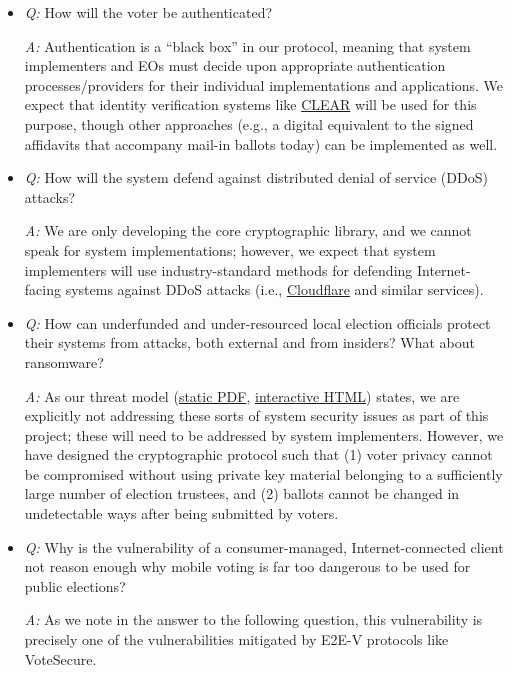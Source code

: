 \documentclass[12pt,letter]{article}
\begin{document}
\begin{itemize}

    \item \emph{Q:} How will the voter be authenticated?

    \emph{A:} Authentication is a ``black box'' in our protocol, meaning that system implementers and EOs must decide upon appropriate authentication processes/providers for their individual implementations and applications. We expect that identity verification systems like \href{https://clearme.com/}{CLEAR} will be used for this purpose, though other approaches (e.g., a digital equivalent to the signed affidavits that accompany mail-in ballots today) can be implemented as well.

    \item \emph{Q:} How will the system defend against distributed denial of service (DDoS) attacks?

    \emph{A:} We are only developing the core cryptographic library, and we cannot speak for system implementations; however, we expect that system implementers will use industry-standard methods for defending Internet-facing systems against DDoS attacks (i.e., \href{https://cloudflare.com/}{Cloudflare} and similar services).

    \item \emph{Q:} How can underfunded and under-resourced local election officials protect their systems from attacks, both external and from insiders? What about ransomware?

    \emph{A:} As our threat model (\href{https://github.com/FreeAndFair/VoteSecure/releases/download/latest/threat-model.pdf}{static PDF}, \href{https://github.com/FreeAndFair/VoteSecure/releases/download/latest/threat-model.html}{interactive HTML}) states, we are explicitly not addressing these sorts of system security issues as part of this project; these will need to be addressed by system implementers. However, we have designed the cryptographic protocol such that (1) voter privacy cannot be compromised without using private key material belonging to a sufficiently large number of election trustees, and (2) ballots cannot be changed in undetectable ways after being submitted by voters.

    \item \emph{Q:} Why is the vulnerability of a consumer-managed, Internet-connected client not reason enough why mobile voting is far too dangerous to be used for public elections?

    \emph{A:} As we note in the answer to the following question, this vulnerability is precisely one of the vulnerabilities mitigated by E2E-V protocols like VoteSecure.


\end{itemize}
\end{document}

